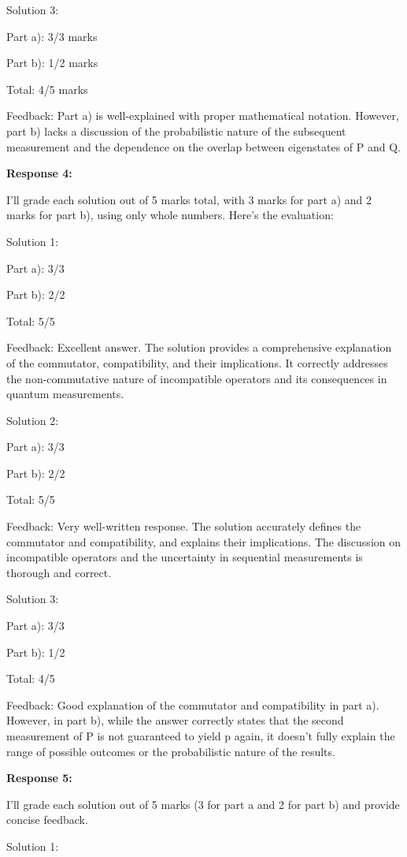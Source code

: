 \documentclass[a4paper,11pt]{article}
\begin{document}
Solution 3:

Part a): 3/3 marks

Part b): 1/2 marks

Total: 4/5 marks

Feedback: Part a) is well-explained with proper mathematical notation. However, part b) lacks a discussion of the probabilistic nature of the subsequent measurement and the dependence on the overlap between eigenstates of P and Q.

\bigskip   
\textbf{Response 4:}

I'll grade each solution out of 5 marks total, with 3 marks for part a) and 2 marks for part b), using only whole numbers. Here's the evaluation:

Solution 1:

Part a): 3/3

Part b): 2/2

Total: 5/5

Feedback: Excellent answer. The solution provides a comprehensive explanation of the commutator, compatibility, and their implications. It correctly addresses the non-commutative nature of incompatible operators and its consequences in quantum measurements.

Solution 2:

Part a): 3/3

Part b): 2/2

Total: 5/5

Feedback: Very well-written response. The solution accurately defines the commutator and compatibility, and explains their implications. The discussion on incompatible operators and the uncertainty in sequential measurements is thorough and correct.

Solution 3:

Part a): 3/3

Part b): 1/2

Total: 4/5

Feedback: Good explanation of the commutator and compatibility in part a). However, in part b), while the answer correctly states that the second measurement of P is not guaranteed to yield p again, it doesn't fully explain the range of possible outcomes or the probabilistic nature of the results.

\bigskip   
\textbf{Response 5:}

I'll grade each solution out of 5 marks (3 for part a and 2 for part b) and provide concise feedback.

Solution 1:
\end{document}
